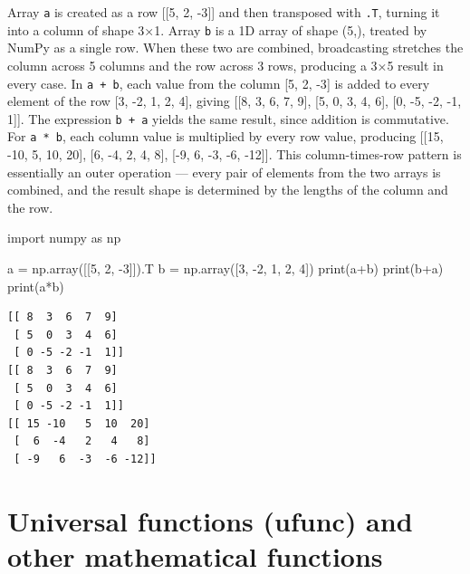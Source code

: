 \documentclass[
  english,
  letterpaper,
  DIV=11,
  numbers=noendperiod]{scrreprt}
\newenvironment{Shaded}{\begin{snugshade}}{\end{snugshade}}
\newcommand{\BuiltInTok}[1]{\textcolor[rgb]{0.00,0.23,0.31}{#1}}
\newcommand{\DecValTok}[1]{\textcolor[rgb]{0.68,0.00,0.00}{#1}}
\newcommand{\ImportTok}[1]{\textcolor[rgb]{0.00,0.46,0.62}{#1}}
\newcommand{\NormalTok}[1]{\textcolor[rgb]{0.00,0.23,0.31}{#1}}
\newcommand{\OperatorTok}[1]{\textcolor[rgb]{0.37,0.37,0.37}{#1}}
\begin{document}
Array \texttt{a} is created as a row {[}{[}5, 2, -3{]}{]} and then
transposed with \texttt{.T}, turning it into a column of shape 3×1.
Array \texttt{b} is a 1D array of shape (5,), treated by NumPy as a
single row. When these two are combined, broadcasting stretches the
column across 5 columns and the row across 3 rows, producing a 3×5
result in every case. In \texttt{a\ +\ b}, each value from the column
{[}5, 2, -3{]} is added to every element of the row {[}3, -2, 1, 2,
4{]}, giving {[}{[}8, 3, 6, 7, 9{]}, {[}5, 0, 3, 4, 6{]}, {[}0, -5, -2,
-1, 1{]}{]}. The expression \texttt{b\ +\ a} yields the same result,
since addition is commutative. For \texttt{a\ *\ b}, each column value
is multiplied by every row value, producing {[}{[}15, -10, 5, 10, 20{]},
{[}6, -4, 2, 4, 8{]}, {[}-9, 6, -3, -6, -12{]}{]}. This column-times-row
pattern is essentially an outer operation --- every pair of elements
from the two arrays is combined, and the result shape is determined by
the lengths of the column and the row.

\begin{Shaded}
\begin{Highlighting}[]
\ImportTok{import}\NormalTok{ numpy }\ImportTok{as}\NormalTok{ np}

\NormalTok{a }\OperatorTok{=}\NormalTok{ np.array([[}\DecValTok{5}\NormalTok{, }\DecValTok{2}\NormalTok{, }\OperatorTok{{-}}\DecValTok{3}\NormalTok{]]).T}
\NormalTok{b }\OperatorTok{=}\NormalTok{ np.array([}\DecValTok{3}\NormalTok{, }\OperatorTok{{-}}\DecValTok{2}\NormalTok{, }\DecValTok{1}\NormalTok{, }\DecValTok{2}\NormalTok{, }\DecValTok{4}\NormalTok{])}
\BuiltInTok{print}\NormalTok{(a}\OperatorTok{+}\NormalTok{b)}
\BuiltInTok{print}\NormalTok{(b}\OperatorTok{+}\NormalTok{a)}
\BuiltInTok{print}\NormalTok{(a}\OperatorTok{*}\NormalTok{b)}
\end{Highlighting}
\end{Shaded}

\begin{verbatim}
[[ 8  3  6  7  9]
 [ 5  0  3  4  6]
 [ 0 -5 -2 -1  1]]
[[ 8  3  6  7  9]
 [ 5  0  3  4  6]
 [ 0 -5 -2 -1  1]]
[[ 15 -10   5  10  20]
 [  6  -4   2   4   8]
 [ -9   6  -3  -6 -12]]
\end{verbatim}

\chapter{Universal functions (ufunc) and other mathematical
functions}\label{universal-functions-ufunc-and-other-mathematical-functions}
\end{document}
